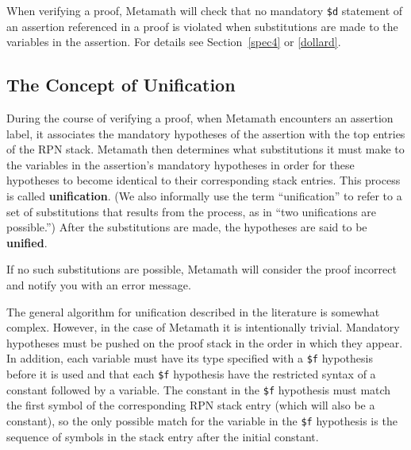 When verifying a proof, Metamath will check that no mandatory
\texttt{\$d} statement of an assertion referenced in a proof is violated
when substitutions are made to the variables in the assertion.  For details
see Section~\ref{spec4} or \ref{dollard}.

\subsection{The Concept of Unification} \label{unify}

During the course of verifying a proof, when Metamath
encounters an assertion label, it associates the
mandatory hypotheses of the assertion with the top
entries of the RPN stack.  Metamath then
determines what substitutions it must make to the variables in the assertion's mandatory
hypotheses in order for these hypotheses to become identical to their
corresponding stack entries.  This process is called {\bf
unification}.  (We also informally use the term
``unification'' to refer to a set of substitutions that results from the
process, as in ``two unifications are possible.'')  After the substitutions
are made, the hypotheses are said to be {\bf unified}.

If no such substitutions are possible, Metamath will consider the proof
incorrect and notify you with an error message.

The general algorithm for unification described in the literature is
somewhat complex.
However, in the case of Metamath it is intentionally trivial.
Mandatory hypotheses must be
pushed on the proof stack in the order in which they appear.
In addition, each variable must have its type specified
with a \texttt{\$f} hypothesis before it is used
and that each \texttt{\$f} hypothesis
have the restricted syntax of a constant followed by a variable.
The constant in the \texttt{\$f} hypothesis must match the first symbol of
the corresponding RPN stack entry (which will also be a constant), so
the only possible match for the variable in the \texttt{\$f} hypothesis is
the sequence of symbols in the stack entry after the initial constant.

